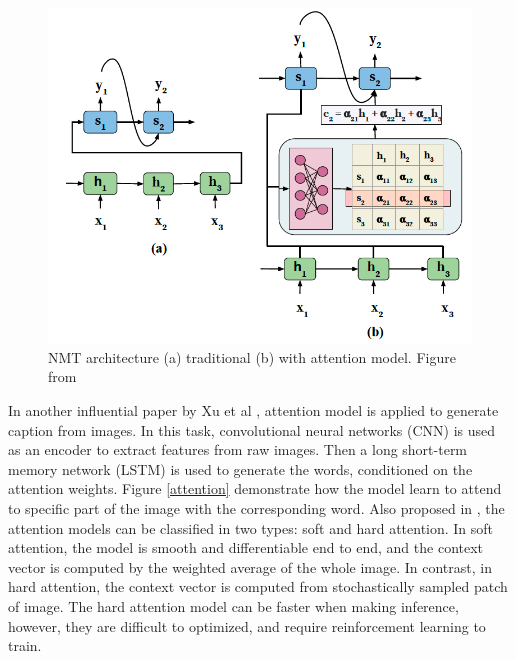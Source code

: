 \documentclass[journal]{IEEEtran}
\begin{document}
\begin{figure}[htb]
  \includegraphics[width=\linewidth]{../NMT.png}
  \caption{NMT architecture (a) traditional (b) with attention model.
  Figure from \cite{chaudhari1904attentive}}
  \label{NMT}
\end{figure}

In another influential paper by Xu et al \cite{xu2015show}, attention model is applied to generate caption from images. 
In this task, convolutional neural networks (CNN) is used as an encoder to extract features from raw images.
Then a long short-term memory network (LSTM) is used to generate the words, conditioned on the attention weights.
Figure \ref{attention} demonstrate how the model learn to attend to specific part of the image with the corresponding word. 
Also proposed in \cite{xu2015show}, the attention models can be classified in two types: soft and hard attention. 
In soft attention, the model is smooth and differentiable end to end, and the context vector is computed by the weighted average of the whole image. 
In contrast, in hard attention, the context vector is computed from stochastically sampled patch of image. 
The hard attention model can be faster when making inference, however, they are difficult to optimized, and require reinforcement learning to train.
\end{document}
